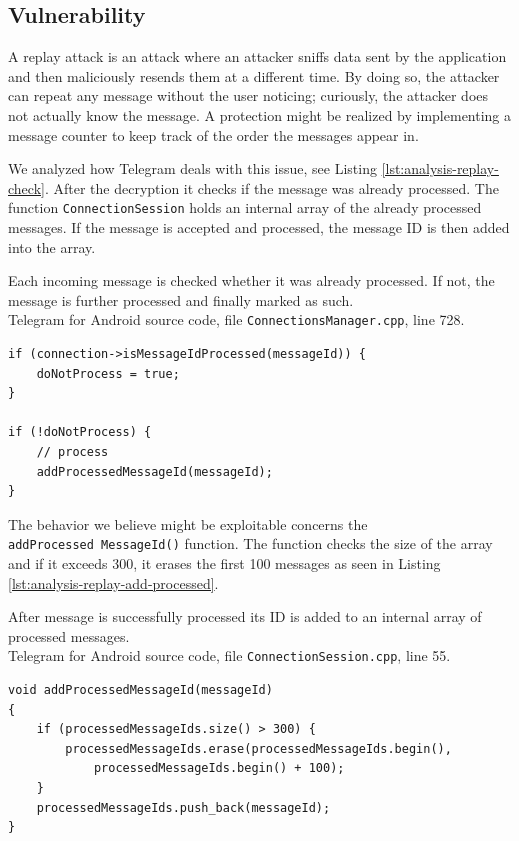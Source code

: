 \documentclass[thesis=M,english]{FITthesis}[2012/10/20]
\begin{document}
\subsection{Vulnerability}

A replay attack is an attack where an attacker sniffs data sent by the application and then maliciously resends them at a different time. By doing so, the attacker can repeat any message without the user noticing; curiously, the attacker does not actually know the message. A protection might be realized by implementing a message counter to keep track of the order the messages appear in.

We analyzed how Telegram deals with this issue, see Listing \ref{lst:analysis-replay-check}. After the decryption it checks if the message was already processed. The function \texttt{ConnectionSession} holds an internal array of the already processed messages. If the message is accepted and processed, the message ID is then added into the array.

\begin{listing}[htb]
\caption{Each incoming message is checked whether it was already processed. If not, the message is further processed and finally marked as such.
\protect\\ Telegram for Android source code, file \texttt{ConnectionsManager.cpp}, line 728.}
\label{lst:analysis-replay-check}
\begin{verbatim}
if (connection->isMessageIdProcessed(messageId)) {
    doNotProcess = true;
}

if (!doNotProcess) {
    // process
    addProcessedMessageId(messageId);
}
\end{verbatim}
\end{listing}


The behavior we believe might be exploitable concerns the \texttt{addProcessed\ MessageId()} function. The function checks the size of the array and if it exceeds 300, it erases the first 100 messages as seen in Listing \ref{lst:analysis-replay-add-processed}.


\begin{listing}[htb]
\caption{After message is successfully processed its ID is added to an internal array of processed messages.
\protect\\ Telegram for Android source code, file \texttt{ConnectionSession.cpp}, line 55.}
\label{lst:analysis-replay-add-processed}
\begin{verbatim}
void addProcessedMessageId(messageId)
{
    if (processedMessageIds.size() > 300) {
        processedMessageIds.erase(processedMessageIds.begin(),
            processedMessageIds.begin() + 100);
    }
    processedMessageIds.push_back(messageId);
}
\end{verbatim}
\end{listing}
\end{document}
